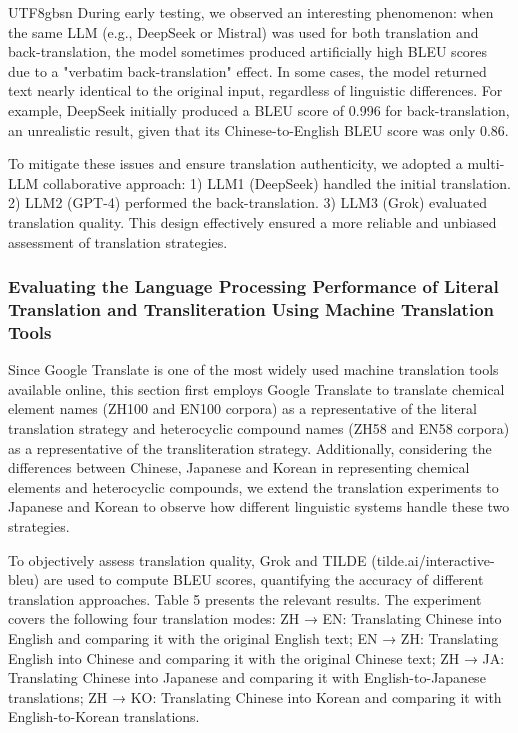 \documentclass[conference]{IEEEtran}
\begin{document}
\begin{CJK*}{UTF8}{gbsn}
During early testing, we observed an interesting phenomenon: when the same LLM (e.g., DeepSeek or Mistral) was used for both translation and back-translation, the model sometimes produced artificially high BLEU scores due to a "verbatim back-translation" effect. In some cases, the model returned text nearly identical to the original input, regardless of linguistic differences. For example, DeepSeek initially produced a BLEU score of 0.996 for back-translation, an unrealistic result, given that its Chinese-to-English BLEU score was only 0.86.


To mitigate these issues and ensure translation authenticity, we adopted a multi-LLM collaborative approach: 1) LLM1 (DeepSeek) handled the initial translation. 2) LLM2 (GPT-4) performed the back-translation. 3) LLM3 (Grok) evaluated translation quality. This design effectively ensured a more reliable and unbiased assessment of translation strategies.

\subsubsection{Evaluating the Language Processing Performance of Literal Translation and Transliteration Using Machine Translation Tools}
Since Google Translate is one of the most widely used machine translation tools available online, this section first employs Google Translate to translate chemical element names (ZH100 and EN100 corpora) as a representative of the literal translation strategy and heterocyclic compound names (ZH58 and EN58 corpora) as a representative of the transliteration strategy. Additionally, considering the differences between Chinese, Japanese and Korean in representing chemical elements and heterocyclic compounds, we extend the translation experiments to Japanese and Korean to observe how different linguistic systems handle these two strategies.

To objectively assess translation quality, Grok and TILDE (tilde.ai/interactive-bleu) are used to compute BLEU scores, quantifying the accuracy of different translation approaches. Table 5 presents the relevant results.
The experiment covers the following four translation modes: ZH → EN: Translating Chinese into English and comparing it with the original English text; EN → ZH: Translating English into Chinese and comparing it with the original Chinese text; ZH → JA: Translating Chinese into Japanese and comparing it with English-to-Japanese translations; ZH → KO: Translating Chinese into Korean and comparing it with English-to-Korean translations.


\end{CJK*}
\end{document}
